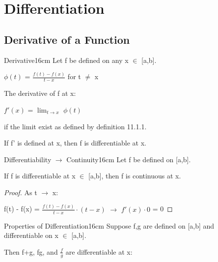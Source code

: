 \newpage

\section[Day 12: Differentiation]{ Differentiation }

\subsection{ Derivative of a Function }

    \begin{definition}{Derivative}{16cm}
        Let f be defined on any x $\in$ [a,b].

        \hspace{1cm}
        $\phi(t)$ = $\frac{f(t) - f(x)}{t - x}$ for t $\not =$ x
        
        The {\color{lblue} derivative} of f at x:

        \hspace{1cm}
        $f'(x)$ = $\lim_{t \rightarrow x}$ $\phi(t)$

        if the limit exist as defined by {\color{blue} definition 11.1.1}.

        If f' is defined at x, then f is differentiable at x.
    \end{definition}

    \vspace{0.5cm}



    \begin{wtheorem}{Differentiability $\rightarrow$ Continuity}{16cm}
        Let f be defined on [a,b].
        
        If f is differentiable at x $\in$ [a,b], then f is continuous at x.        
    \end{wtheorem}

    \begin{proof}
        As t $\rightarrow$ x:

        \hspace{1cm}
        f(t) - f(x)
        = $\frac{f(t)- f(x)}{t-x} \cdot (t-x)$
        $\rightarrow$ $f'(x) \cdot 0$
        = 0
    \end{proof}

    \vspace{0.5cm}



    \begin{wtheorem}{Properties of Differentiation}{16cm}
        Suppose f,g are defined on [a,b] and differentiable on
        x $\in$ [a,b].
        
        Then f+g, fg, and $\frac{f}{g}$ are differentiable at x:        
    \end{wtheorem}

